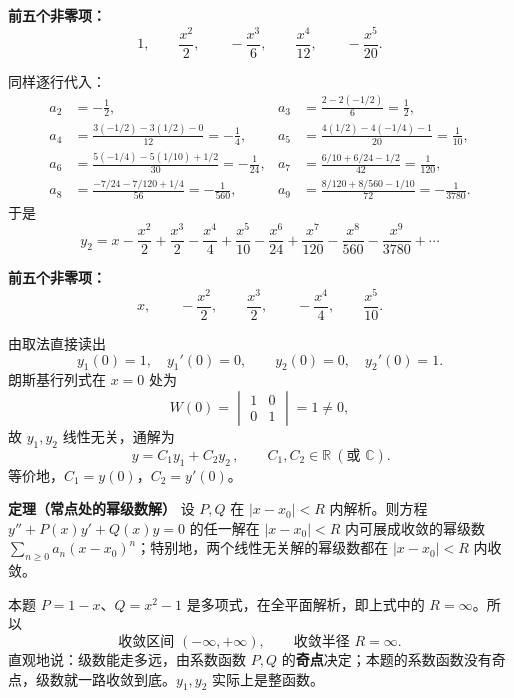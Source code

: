 ﻿\documentclass[11pt]{ctexart}
\renewcommand{\callout}[1]{\par\medskip\noindent
  \colorbox{bandviolet}{\parbox{0.955\linewidth}{\vspace{2pt}#1\vspace{2pt}}}%
  \par\medskip}
\begin{document}
\textbf{前五个非零项：}
\[ 1,\qquad \frac{x^2}{2},\qquad -\frac{x^3}{6},\qquad \frac{x^4}{12},\qquad -\frac{x^5}{20}. \]


同样逐行代入：
\begin{align*}
a_2&=-\frac12, &
a_3&=\frac{2-2(-1/2)}{6}=\frac12,\\
a_4&=\frac{3(-1/2)-3(1/2)-0}{12}=-\frac14, &
a_5&=\frac{4(1/2)-4(-1/4)-1}{20}=\frac1{10},\\
a_6&=\frac{5(-1/4)-5(1/10)+1/2}{30}=-\frac1{24}, &
a_7&=\frac{6/10+6/24-1/2}{42}=\frac1{120},\\
a_8&=\frac{-7/24-7/120+1/4}{56}=-\frac1{560}, &
a_9&=\frac{8/120+8/560-1/10}{72}=-\frac1{3780}.
\end{align*}
于是
\[
y_2=x-\frac{x^2}{2}+\frac{x^3}{2}-\frac{x^4}{4}+\frac{x^5}{10}
-\frac{x^6}{24}+\frac{x^7}{120}-\frac{x^8}{560}-\frac{x^9}{3780}+\cdots
\]

\textbf{前五个非零项：}
\[ x,\qquad -\frac{x^2}{2},\qquad \frac{x^3}{2},\qquad -\frac{x^4}{4},\qquad \frac{x^5}{10}. \]


由取法直接读出
\[ y_1(0)=1,\quad y_1'(0)=0,\qquad y_2(0)=0,\quad y_2'(0)=1 . \]
朗斯基行列式在 $x=0$ 处为
\[ W(0)=\begin{vmatrix}1&0\\0&1\end{vmatrix}=1\neq0 , \]
故 $y_1,y_2$ 线性无关，通解为
\[ \boxed{\,y=C_1y_1+C_2y_2\,},\qquad C_1,C_2\in\mathbb{R}\ (\text{或 }\mathbb{C}). \]
等价地，$C_1=y(0)$，$C_2=y'(0)$。


\callout{
\textbf{定理（常点处的幂级数解）}\;
设 $P,Q$ 在 $|x-x_0|<R$ 内解析。则方程 $y''+P(x)y'+Q(x)y=0$ 的任一解在 $|x-x_0|<R$ 内可展成收敛的幂级数 $\sum_{n\ge0}a_n(x-x_0)^n$；特别地，两个线性无关解的幂级数都在 $|x-x_0|<R$ 内收敛。
}

本题 $P=1-x$、$Q=x^2-1$ 是多项式，在全平面解析，即上式中的 $R=\infty$。所以
\[ \boxed{\text{收敛区间 }(-\infty,+\infty),\qquad \text{收敛半径 }R=\infty .} \]
直观地说：级数能走多远，由系数函数 $P,Q$ 的\textbf{奇点}决定；本题的系数函数没有奇点，级数就一路收敛到底。$y_1,y_2$ 实际上是整函数。


\end{document}
